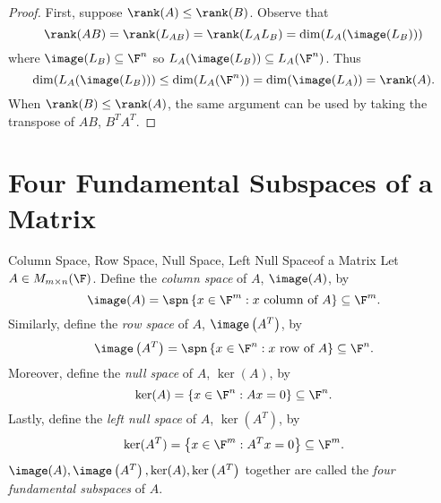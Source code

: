 \documentclass[linearalgebraI]{subfiles}
\begin{document}
    \begin{proof}
        First, suppose $\rank (A)\leq \rank(B)$. Observe that
        \begin{equation*}
            \rank(AB) = \rank( L_{AB}) = \rank (L_AL_B) = \dim (L_A(\image(L_B)))
        \end{equation*}
        where $\image(L_B)\subseteq \F^n$ so $L_A(\image(L_B))\subseteq L_A(\F^n)$. Thus
        \begin{equation*}
            \dim (L_A(\image(L_B))) \leq \dim (L_A(\F^n)) = \dim (\image(L_A)) = \rank(A).
        \end{equation*}
        When $\rank(B)\leq \rank(A)$, the same argument can be used by taking the transpose of $AB$, $B^TA^T$.
    \end{proof}

    \section{Four Fundamental Subspaces of a Matrix}

    \begin{definition}{Column Space, Row Space, Null Space, Left Null Space}{of a Matrix}
        Let $A\in M_{m\times n}(\F)$. Define the \emph{column space} of $A$, $\image(A)$, by
            \begin{equation*}
                \image(A) = \spn \left\lbrace x\in \F^m: x\text{ column of }A \right\rbrace \subseteq\F^m.
            \end{equation*}
            Similarly, define the \emph{row space} of $A$, $\image\left( A^{T}  \right) $, by
            \begin{equation*}
                \image\left( A^{T}  \right)  = \spn \left\lbrace x\in \F^n: x\text{ row of }A \right\rbrace\subseteq\F^n.
            \end{equation*}
            Moreover, define the \emph{null space} of $A$, $\ker(A)$, by
            \begin{equation*}
                \ker(A) = \left\lbrace x\in \F^n: Ax = 0 \right\rbrace\subseteq\F^n.
            \end{equation*}
            Lastly, define the \emph{left null space} of $A$, $\ker\left( A^{T}  \right) $, by
            \begin{equation*}
                \ker (A^T) = \left\lbrace x\in \F^m: A^Tx = 0 \right\rbrace\subseteq\F^m.
            \end{equation*}
            $\image(A), \image\left( A^{T} \right) , \ker(A), \ker\left( A^{T}  \right)$ together are called the \emph{four fundamental subspaces} of $A$.
    \end{definition}
\end{document}
